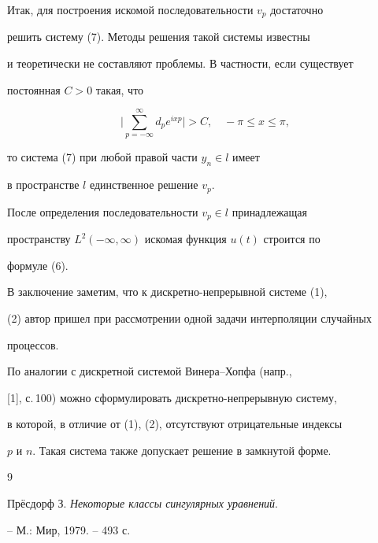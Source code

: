  


Итак, для построения искомой последовательности $v_p$ достаточно 


решить систему (7). Методы решения такой системы известны  


и теоретически не составляют проблемы. В частности, если существует 


постоянная $C>0$ такая, что 


$$ 


\bigg|\sum^\infty_{p=-\infty}d_p e^{ixp}\bigg|>C,\quad 


-\pi\le x\le\pi, 


$$ 


то система (7) при любой правой части $y_n\in l$ имеет 


в пространстве $l$ единственное решение $v_p$.  


После определения последовательности $v_p\in l$ принадлежащая 


пространству $L^2(-\infty,\infty)$ искомая функция $u(t)$ строится по 


формуле (6). 


 


В заключение заметим, что к дискретно-непрерывной системе (1), 


(2) автор пришел при рассмотрении одной задачи интерполяции случайных 


процессов. 


 


По аналогии с дискретной системой Винера--Хопфа (напр., 


[1], с.\,100) можно сформулировать дискретно-непрерывную систему, 


в которой, в отличие от (1), (2), отсутствуют отрицательные индексы 


$p$ и $n$. Такая система также допускает решение в замкнутой форме.


 


\begin{thebibliography}{9} 


 




Пр\"есдорф З. {\em Некоторые классы сингулярных уравнений}. 


-- М.: Мир, 1979. -- 493 с. 


 


\end{thebibliography} 


 


\vskip 1cm 


 






 


\label{end} 


 


